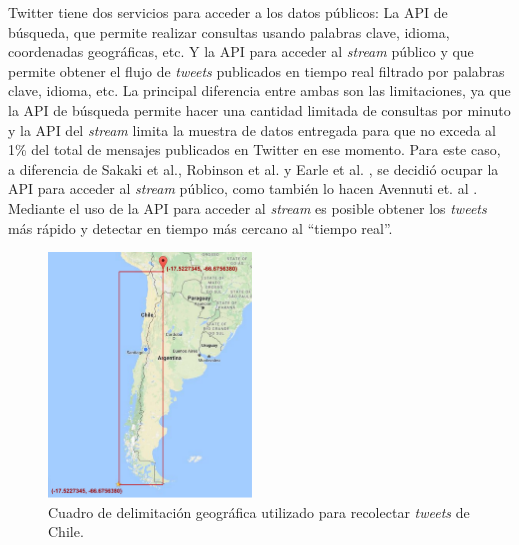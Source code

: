 Twitter tiene dos servicios para acceder a los datos públicos: 
%
La API de búsqueda, que permite realizar consultas usando palabras clave, idioma, coordenadas geográficas, etc. 
%
Y la API para acceder al \textit{stream} público y que permite obtener el flujo de \textit{tweets} publicados en tiempo real filtrado por palabras clave, idioma, etc.
%
La principal diferencia entre ambas son las limitaciones, ya que la API de búsqueda permite hacer una cantidad limitada de consultas por minuto y la API del \textit{stream} limita la muestra de datos entregada para que no exceda al 1\% del total de mensajes publicados en Twitter en ese momento.
% 
Para este caso, a diferencia de Sakaki et al.\cite{sakaki2013tweet}, Robinson et al. \cite{robinson2013sensitive} y Earle et al. \cite{earle2012twitter}, se decidió ocupar la API para acceder al \textit{stream} público, como también lo hacen Avennuti et. al \cite{avvenuti2014earthquake}.
%
Mediante el uso de la API para acceder al \textit{stream} es posible obtener los \textit{tweets} más rápido y detectar en tiempo más cercano al ``tiempo real''. %

\begin{figure}
	\vspace{-20px}
  \centering
    \includegraphics[width=0.48\textwidth]{imagenes/boundingbox.pdf}
  \caption{Cuadro de delimitación geográfica utilizado para recolectar \textit{tweets} de Chile.}
  \label{img:boundingbox}
  \vspace{-10px}
\end{figure}

